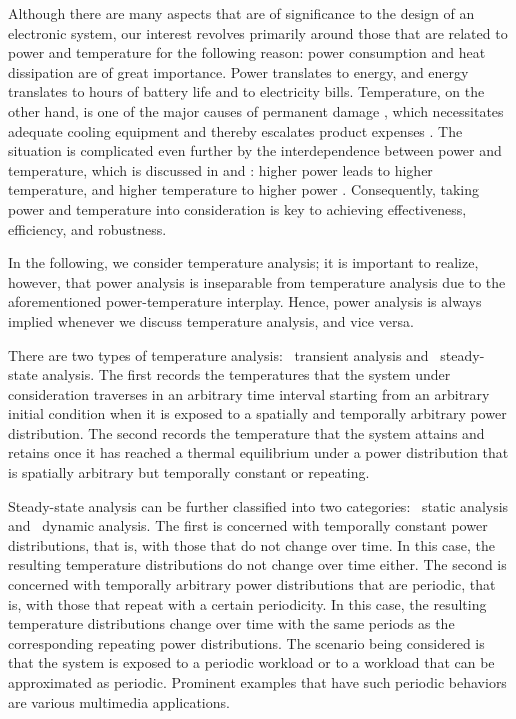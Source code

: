 Although there are many aspects that are of significance to the design of an
electronic system, our interest revolves primarily around those that are related
to power and temperature for the following reason: power consumption and heat
dissipation are of great importance. Power translates to energy, and energy
translates to hours of battery life and to electricity bills. Temperature, on
the other hand, is one of the major causes of permanent damage \cite{jedec2016},
which necessitates adequate cooling equipment and thereby escalates product
expenses \cite{chaudhry2015}. The situation is complicated even further by the
interdependence between power and temperature, which is discussed in
 and : higher power leads to higher
temperature, and higher temperature to higher power \cite{liu2007}.
Consequently, taking power and temperature into consideration is key to
achieving effectiveness, efficiency, and robustness.

In the following, we consider temperature analysis; it is important to realize,
however, that power analysis is inseparable from temperature analysis due to the
aforementioned power-temperature interplay. Hence, power analysis is always
implied whenever we discuss temperature analysis, and vice versa.

There are two types of temperature analysis: \one~transient analysis and
\two~steady-state analysis. The first records the temperatures that the system
under consideration traverses in an arbitrary time interval starting from an
arbitrary initial condition when it is exposed to a spatially and temporally
arbitrary power distribution. The second records the temperature that the system
attains and retains once it has reached a thermal equilibrium under a power
distribution that is spatially arbitrary but temporally constant or repeating.

Steady-state analysis can be further classified into two categories: \one~static
analysis and \two~dynamic analysis. The first is concerned with temporally
constant power distributions, that is, with those that do not change over time.
In this case, the resulting temperature distributions do not change over time
either. The second is concerned with temporally arbitrary power distributions
that are periodic, that is, with those that repeat with a certain periodicity.
In this case, the resulting temperature distributions change over time with the
same periods as the corresponding repeating power distributions. The scenario
being considered is that the system is exposed to a periodic workload or to a
workload that can be approximated as periodic. Prominent examples that have such
periodic behaviors are various multimedia applications.
